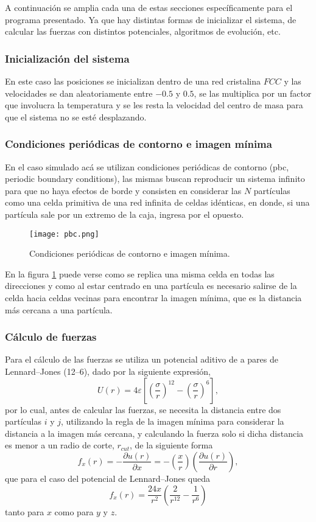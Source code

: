 \documentclass[a4paper,spanish,12pt,twoside]{article}
\begin{document}
A continuación se amplia cada una de estas secciones específicamente para el programa presentado. Ya que hay distintas formas de inicializar el sistema, de calcular las fuerzas con distintos potenciales, algoritmos de evolución, etc.

\subsubsection{Inicialización del sistema}

En este caso las posiciones se inicializan dentro de una red cristalina $FCC$ y las velocidades se dan aleatoriamente entre $-0.5$ y $0.5$, se las multiplica por un factor que involucra la temperatura y se les resta la velocidad del centro de masa para que el sistema no se esté desplazando.


\subsubsection{Condiciones periódicas de contorno e imagen mínima}

En el caso simulado acá se utilizan condiciones periódicas de contorno (pbc, periodic boundary conditions), las mismas buscan reproducir un sistema infinito para que no haya efectos de borde y consisten en considerar las $N$ partículas como una celda primitiva de una red infinita de celdas idénticas, en donde, si una partícula sale por un extremo de la caja, ingresa por el opuesto.

\begin{figure}[h]
	\centering
	\texttt{[image: pbc.png]}
	\caption{Condiciones periódicas de contorno e imagen mínima.}
	\label{fig:pbc}
\end{figure}

En la figura \ref{fig:pbc} puede verse como se replica una misma celda en todas las direcciones y como al estar centrado en una partícula es necesario salirse de la celda hacia celdas vecinas para encontrar la imagen mínima, que es la distancia más cercana a una partícula.

\subsubsection{Cálculo de fuerzas}

Para el cálculo de las fuerzas se utiliza un potencial aditivo de a pares de Lennard--Jones (12--6), dado por la siguiente expresión,
$$
U(r) = 4\varepsilon \left[ \left( \frac{\sigma}{r} \right)^{12} - \left( \frac{\sigma}{r} \right)^6 \right],
$$
por lo cual, antes de calcular las fuerzas, se necesita la distancia entre dos partículas $i$ y $j$, utilizando la regla de la imagen mínima para considerar la distancia a la imagen más cercana, y calculando la fuerza solo si dicha distancia es menor a un radio de corte, $r_{cut}$, de la siguiente forma
$$
f_x(r) = -\frac{\partial u(r)}{\partial x} = - \left(\frac{x}{r}\right) \left( \frac{\partial u(r)}{\partial r} \right),
$$
que para el caso del potencial de Lennard--Jones queda
$$
f_x(r) = \frac{24x}{r^2} \left( \frac{2}{r^{12}} - \frac{1}{r^6} \right)
$$
tanto para $x$ como para $y$ y $z$.
\end{document}
